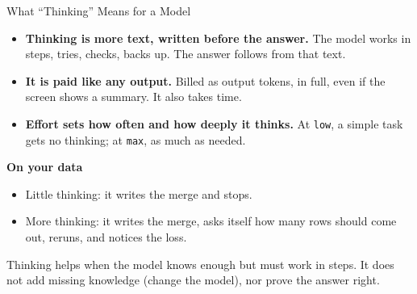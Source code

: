 \documentclass[svgnames,x11names,dvipsnames]{beamer}
\newcommand{\chg}[1]{{\bfseries #1}}
\renewcommand{\chg}[1]{#1}
\begin{document}
\begin{frame}{\chg{What ``Thinking'' Means for a Model}}

\centering
{}

\vspace{0.1cm}
\raggedright
\small
\begin{itemize}
    \setlength{\itemsep}{2pt}
    \item \textbf{\chg{Thinking is more text, written before the answer.}} \chg{The model works in steps, tries, checks, backs up. The answer follows from that text.}
    \item \textbf{\chg{It is paid like any output.}} \chg{Billed as output tokens, in full, even if the screen shows a summary. It also takes time.}
    \item \textbf{\chg{Effort sets how often and how deeply it thinks.}} \chg{At \texttt{low}, a simple task gets no thinking; at \texttt{max}, as much as needed.}
\end{itemize}

\vspace{0.05cm}

\textbf{\chg{On your data}}
\begin{itemize}
    \setlength{\itemsep}{2pt}
    \item \chg{Little thinking: it writes the merge and stops.}
    \item \chg{More thinking: it writes the merge, asks itself how many rows should come out, reruns, and notices the loss.}
\end{itemize}

\vspace{0.15cm}
{\footnotesize \chg{Thinking helps when the model knows enough but must work in steps. It does not add missing knowledge (change the model), nor prove the answer right.}}

\end{frame}
\end{document}
